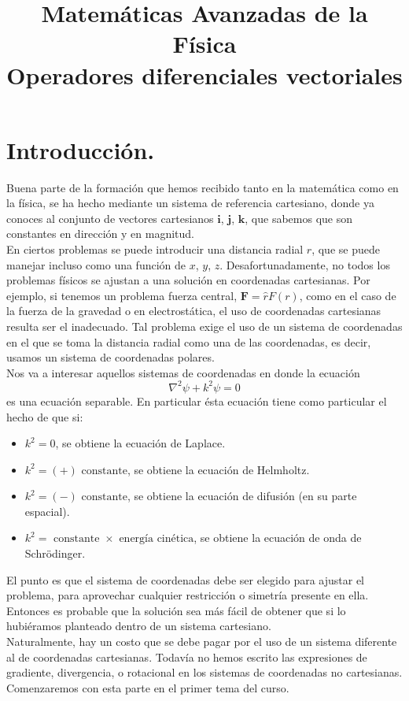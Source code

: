 
\usepackage{tikz-3dplot}
\title{Matemáticas Avanzadas de la Física \\ {\large Operadores diferenciales vectoriales}}
\date{ }

\renewcommand\labelenumii{\theenumi.{\arabic{enumii}}}
\maketitle
\fontsize{14}{14}\selectfont
\section{Introducción.}
Buena parte de la formación que hemos recibido tanto en la matemática como en la física, se ha hecho mediante un sistema de referencia cartesiano, donde ya conoces al conjunto de vectores cartesianos $\mathbf{i}$, $\mathbf{j}$, $\mathbf{k}$, que sabemos que son constantes en dirección y en magnitud. 
\\
En ciertos problemas se puede introducir una distancia radial $r$, que se puede manejar incluso como una función de $x$, $y$, $z$. Desafortunadamente, no todos los problemas físicos se ajustan a una solución en coordenadas cartesianas. Por ejemplo, si tenemos un problema fuerza central, $\mathbf{F} = \widehat{r} F(r)$, como en el caso de la fuerza de la gravedad o en electrostática, el uso de coordenadas cartesianas resulta ser el inadecuado. Tal problema exige el uso de un sistema de coordenadas en el que se toma la distancia radial como una de las coordenadas, es decir, usamos un sistema de coordenadas polares.
\\
Nos va a interesar aquellos sistemas de coordenadas en donde la ecuación
\[ \nabla^{2} \psi + k^{2} \psi =0 \]
es una ecuación separable.  En particular ésta ecuación tiene como particular el hecho de que si:
\begin{itemize}
\item $k^{2} = 0$, se obtiene la ecuación de Laplace.
\item $k^{2} = (+) \mbox{ constante}$, se obtiene la ecuación de Helmholtz.
\item $k^{2} = (-) \mbox{ constante}$, se obtiene la ecuación de difusión (en su parte espacial).
\item $k^{2} = \mbox{ constante } \times \mbox{ energía cinética}$, se obtiene la ecuación de onda de Schrödinger.
\end{itemize}
El punto es que el sistema de coordenadas debe ser elegido para ajustar el problema, para aprovechar cualquier restricción o simetría presente en ella. Entonces es probable que la solución sea más fácil de obtener que si lo hubiéramos planteado dentro de un sistema cartesiano.
\\
Naturalmente, hay un costo que se debe pagar por el uso de un sistema diferente al de coordenadas cartesianas. Todavía no hemos escrito las expresiones de gradiente, divergencia, o rotacional en los sistemas de coordenadas no cartesianas. Comenzaremos con esta parte en el primer tema del curso.
